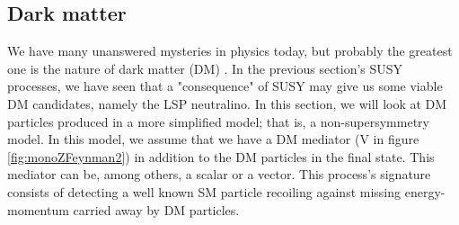 \subsection{Dark matter}
\label{sec:DM}
We have many unanswered mysteries in physics today, but probably the greatest one is the nature of dark matter (DM) \cite{monoZexclusion}. In the previous section's SUSY processes, we have seen that a "consequence" of SUSY may give us some viable DM candidates, namely the LSP neutralino. In this section, we will look at DM particles produced in a more simplified model; that is, a non-supersymmetry model. In this model, we assume that we have a DM mediator (V in figure \ref{fig:monoZFeynman2}) in addition to the DM particles in the final state. This mediator can be, among others, a scalar or a vector. This process's signature consists of detecting a well known SM particle recoiling against missing energy-momentum carried away by DM particles. 

